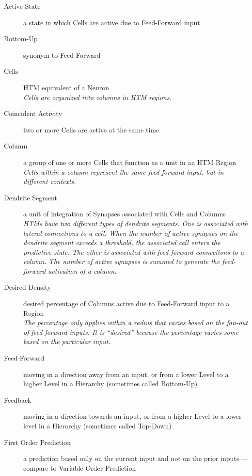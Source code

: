 \documentclass{report}
\begin{document}
\begin{description}
\item[Active State]{a state in which Cells are active due to
  Feed-Forward input}

\item[Bottom-Up]{synonym to Feed-Forward}

\item[Cells]{HTM equivalent of a Neuron\\{\em Cells are organized into
    columns in HTM regions.}}

\item[Coincident Activity]{two or more Cells are active at the same
  time}

\item[Column]{a group of one or more Cells that function as a unit in
  an HTM Region\\{\em Cells within a column represent the same
    feed-forward input, but in different contexts.}}

\item[Dendrite Segment]{a unit of integration of Synapses associated
  with Cells and Columns\\{\em HTMs have two different types of
    dendrite segments. One is associated with lateral connections to a
    cell. When the number of active synapses on the dendrite segment
    exceeds a threshold, the associated cell enters the predictive
    state. The other is associated with feed-forward connections to a
    column. The number of active synapses is summed to generate the
    feed-forward activation of a column.}}

\item[Desired Density]{desired percentage of Columns active due to
  Feed-Forward input to a Region\\{\em The percentage only applies
    within a radius that varies based on the fan-out of feed-forward
    inputs. It is ``desired'' because the percentage varies some based
    on the particular input.}}

\item[Feed-Forward]{moving in a direction away from an input, or from
  a lower Level to a higher Level in a Hierarchy (sometimes called
  Bottom-Up)}

\item[Feedback]{moving in a direction towards an input, or from a
  higher Level to a lower level in a Hierarchy (sometimes called
  Top-Down)}

\item[First Order Prediction]{a prediction based only on the current
  input and not on the prior inputs --- compare to Variable Order
  Prediction}


\end{description}
\end{document}
